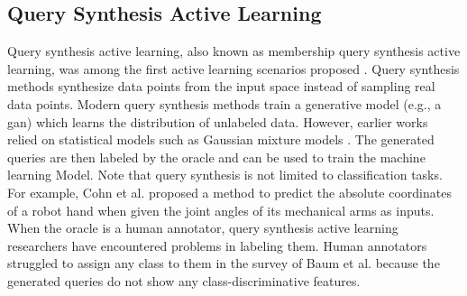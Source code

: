 \subsection{Query Synthesis Active Learning}
\label{sec:QuerySynthesisActiveLearning}
Query synthesis active learning, also known as membership query synthesis active learning, was among the first active learning scenarios proposed
\cite{angluin1988queries}. Query synthesis methods synthesize data points from the input space instead of sampling real data points. Modern query
synthesis methods train a generative model (e.g., a \gls{gan}) \cite{zhu2017generative}
which learns the distribution of unlabeled data. However, earlier works relied on statistical models such as Gaussian mixture models 
\cite{cohn1996active}. The generated queries are then labeled by the oracle and can be used to train the machine learning Model. Note that
query synthesis is not limited to classification tasks. For example, Cohn et al. \cite{cohn1996active} proposed a method to predict the absolute coordinates
of a robot hand when given the joint angles of its mechanical arms as inputs. When the oracle is a human annotator, query synthesis active learning
researchers have encountered problems in labeling them. Human annotators struggled to assign any class to them in the survey of Baum et al. \cite{baum1992query}
because the generated queries do not show any class-discriminative features.


